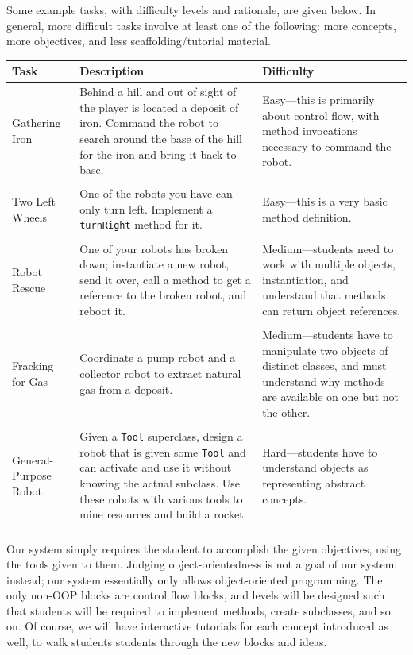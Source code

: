 \documentclass[12pt,notitlepage]{article}
\begin{document}
Some example tasks, with difficulty levels and rationale, are given
below. In general, more difficult tasks involve at least one of the
following: more concepts, more objectives, and less
scaffolding/tutorial material.

\noindent\begin{tabu}{lXX}
  \\
\toprule
Task & Description & Difficulty \\
\midrule
Gathering Iron & Behind a hill and out of sight of the player is
located a deposit of iron. Command the robot to search around the base
of the hill for the iron and bring it back to base.& Easy---this is
primarily about control flow, with method invocations necessary to
command the robot. \\
\\
Two Left Wheels & One of the robots you have can only turn
left. Implement a \texttt{turnRight} method for it. & Easy---this is a
very basic method definition.\\ \\
Robot Rescue & One of your robots has broken down; instantiate a new robot, send it over, call a method to get a reference to the broken robot, and reboot it. & Medium---students need to work with multiple objects, instantiation, and understand that methods can return object references. \\ \\
Fracking for Gas & Coordinate a pump robot and a collector robot to extract natural gas from a deposit. & Medium---students have to manipulate two objects of distinct classes, and must understand why methods are available on one but not the other. \\ \\
General-Purpose Robot & Given a \texttt{Tool} superclass, design a robot that is given some \texttt{Tool} and can activate and use it without knowing the actual subclass. Use these robots with various tools to mine resources and build a rocket. & Hard---students have to understand objects as representing abstract concepts. \\
\bottomrule
\\
\end{tabu}
Our system simply requires the student to accomplish the given
objectives, using the tools given to them. Judging object-orientedness
is not a goal of our system: instead; our system essentially only
allows object-oriented programming. The only non-OOP blocks are
control flow blocks, and levels will be designed such that students
will be required to implement methods, create subclasses, and so
on. Of course, we will have interactive tutorials for each concept
introduced as well, to walk students students through the new blocks
and ideas.
\end{document}
